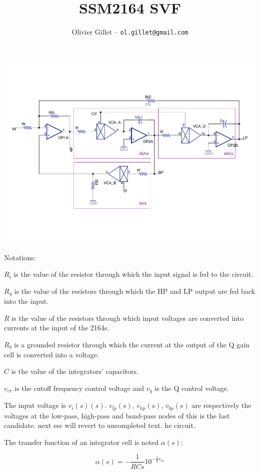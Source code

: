 \documentclass[a4paper,11pt]{article}
\title{SSM2164 SVF}
\author{Olivier Gillet -- \tt ol.gillet@gmail.com}
\date{}
\begin{document}
\maketitle

\includegraphics[width=\textwidth]{svf_schematics.pdf}


Notations:

$R_i$ is the value of the resistor through which the input signal is fed to the circuit.

$R_g$ is the value of the resistors through which the HP and LP output are fed back into the input.

$R$ is the value of the resistors through which input voltages are converted into currents at the input of the 2164s.

$R_b$ is a grounded resistor through which the current at the output of the Q gain cell is converted into a voltage.

$C$ is the value of the integrators' capacitors.

$v_{cv}$ is the cutoff frequency control voltage and $v_{q}$ is the Q control voltage.


The input voltage is $v_i(s)(s)$. $v_{lp}(s)$, $v_{hp}(s)$, $v_{bp}(s)$ are respectively the voltages at the low-pass, high-pass and band-pass nodes of this is the last candidate.  next esc will revert to uncompleted text. he circuit.

The transfer function of an integrator cell is noted $\alpha(s)$:

\begin{equation}
\alpha(s) = -\frac{1}{RCs} 10^{-\frac{3}{2} v_{cv}}
\end{equation}
\end{document}
